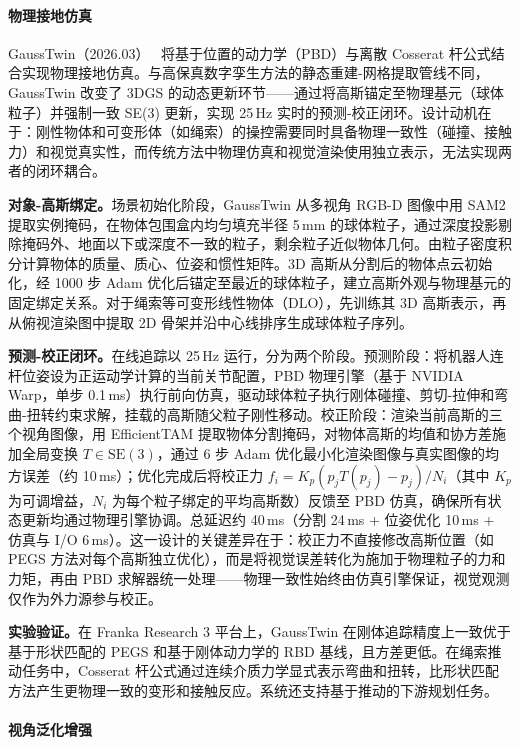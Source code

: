 \paragraph{物理接地仿真}

GaussTwin（2026.03）~\cite{2603_05108} 将基于位置的动力学（PBD）与离散 Cosserat 杆公式结合实现物理接地仿真。与高保真数字孪生方法的静态重建-网格提取管线不同，GaussTwin 改变了 3DGS 的动态更新环节——通过将高斯锚定至物理基元（球体粒子）并强制一致 SE(3) 更新，实现 25\,Hz 实时的预测-校正闭环。设计动机在于：刚性物体和可变形体（如绳索）的操控需要同时具备物理一致性（碰撞、接触力）和视觉真实性，而传统方法中物理仿真和视觉渲染使用独立表示，无法实现两者的闭环耦合。

\textbf{对象-高斯绑定。}场景初始化阶段，GaussTwin 从多视角 RGB-D 图像中用 SAM2 提取实例掩码，在物体包围盒内均匀填充半径 5\,mm 的球体粒子，通过深度投影剔除掩码外、地面以下或深度不一致的粒子，剩余粒子近似物体几何。由粒子密度积分计算物体的质量、质心、位姿和惯性矩阵。3D 高斯从分割后的物体点云初始化，经 1000 步 Adam 优化后锚定至最近的球体粒子，建立高斯外观与物理基元的固定绑定关系。对于绳索等可变形线性物体（DLO），先训练其 3D 高斯表示，再从俯视渲染图中提取 2D 骨架并沿中心线排序生成球体粒子序列。

\textbf{预测-校正闭环。}在线追踪以 25\,Hz 运行，分为两个阶段。预测阶段：将机器人连杆位姿设为正运动学计算的当前关节配置，PBD 物理引擎（基于 NVIDIA Warp，单步 0.1\,ms）执行前向仿真，驱动球体粒子执行刚体碰撞、剪切-拉伸和弯曲-扭转约束求解，挂载的高斯随父粒子刚性移动。校正阶段：渲染当前高斯的三个视角图像，用 EfficientTAM 提取物体分割掩码，对物体高斯的均值和协方差施加全局变换 $T \in \text{SE}(3)$，通过 6 步 Adam 优化最小化渲染图像与真实图像的均方误差（约 10\,ms）；优化完成后将校正力 $f_i = K_p(p_j T(p_j) - p_j) / N_i$（其中 $K_p$ 为可调增益，$N_i$ 为每个粒子绑定的平均高斯数）反馈至 PBD 仿真，确保所有状态更新均通过物理引擎协调。总延迟约 40\,ms（分割 24\,ms + 位姿优化 10\,ms + 仿真与 I/O 6\,ms）。这一设计的关键差异在于：校正力不直接修改高斯位置（如 PEGS 方法对每个高斯独立优化），而是将视觉误差转化为施加于物理粒子的力和力矩，再由 PBD 求解器统一处理——物理一致性始终由仿真引擎保证，视觉观测仅作为外力源参与校正。

\textbf{实验验证。}在 Franka Research 3 平台上，GaussTwin 在刚体追踪精度上一致优于基于形状匹配的 PEGS 和基于刚体动力学的 RBD 基线，且方差更低。在绳索推动任务中，Cosserat 杆公式通过连续介质力学显式表示弯曲和扭转，比形状匹配方法产生更物理一致的变形和接触反应。系统还支持基于推动的下游规划任务。

\paragraph{视角泛化增强}

